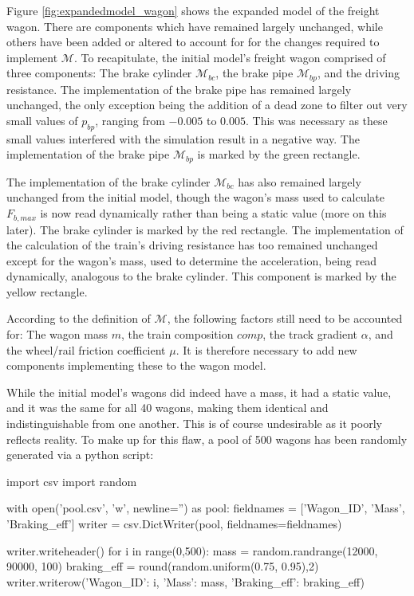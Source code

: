 \par\noindent
Figure \ref{fig:expandedmodel_wagon} shows the expanded model of the freight wagon. There are components which have remained largely unchanged, while others have been added or altered to account for for the changes required to implement ${\mathcal{M}}$. To recapitulate, the initial model's freight wagon comprised of three components: The brake cylinder ${\mathcal{M}}_{bc}$, the brake pipe ${\mathcal{M}}_{bp}$, and the driving resistance. The implementation of the brake pipe has remained largely unchanged, the only exception being the addition of a dead zone to filter out very small values of $p_{bp}$, ranging from $-0.005$ to $0.005$. This was necessary as these small values interfered with the simulation result in a negative way. The implementation of the brake pipe ${\mathcal{M}}_{bp}$ is marked by the green rectangle.
\par
The implementation of the brake cylinder ${\mathcal{M}}_{bc}$ has also remained largely unchanged from the initial model, though the wagon's mass used to calculate $F_{b,max}$ is now read dynamically rather than being a static value (more on this later). The brake cylinder is marked by the red rectangle. The implementation of the calculation of the train's driving resistance has too remained unchanged except for the wagon's mass, used to determine the acceleration, being read dynamically, analogous to the brake cylinder. This component is marked by the yellow rectangle.
\bigskip
\par\noindent
According to the definition of ${\mathcal{M}}$, the following factors still need to be accounted for: The wagon mass $m$, the train composition $comp$, the track gradient $\alpha$, and the wheel/rail friction coefficient $\mu$. It is therefore necessary to add new components implementing these to the wagon model.
\par
While the initial model's wagons did indeed have a mass, it had a static value, and it was the same for all 40 wagons, making them identical and indistinguishable from one another. This is of course undesirable as it poorly reflects reality. To make up for this flaw, a pool of 500 wagons has been randomly generated via a python script:

\bigskip
\begin{python}
import csv
import random

with open('pool.csv', 'w', newline='') as pool:
	fieldnames = ['Wagon_ID', 'Mass', 'Braking_eff']
	writer = csv.DictWriter(pool, fieldnames=fieldnames)
	
	writer.writeheader()
	for i in range(0,500): 
		mass = random.randrange(12000, 90000, 100)
		braking_eff = round(random.uniform(0.75, 0.95),2)
		writer.writerow({'Wagon_ID': i, 'Mass': mass, 'Braking_eff': braking_eff})
\end{python}
\bigskip

